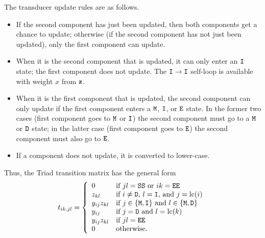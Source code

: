 The transducer update rules are as follows.
\begin{itemize}
\item If the second component has just been updated, then both components
get a chance to update; otherwise (if the second component has not just
been updated), only the first component can update.
\item When it is the second component that is updated, it can only enter an
$\mathtt{I}$ state; the first component does not update.  The $\mathtt{I}\to\mathtt{I}$
self-loop is available with weight $x$ from $\mathbf{z}$.
\item When it is the first component that is updated, the second component
can only update if the first component enters a $\mathtt{M}$, $\mathtt{I}$, or $\mathtt{E}$
state.  In the former two cases (first component goes to $\mathtt{M}$ or $\mathtt{I}$)
the second component must go to a $\mathtt{M}$ or $\mathtt{D}$ state; in the latter
case (first component goes to $\mathtt{E}$) the second component must also go to
$\mathtt{E}$.
\item If a component does not update, it is converted to lower-case.
\end{itemize}

Thus, the Triad transition matrix has the general form
\[
t_{ik,jl} = \left\{ \begin{array}{ll}
0 & \mbox{if $jl=\mathtt{SS}$ or $ik=\mathtt{EE}$} \\
z_{kl} & \mbox{if $i \neq \mathtt{D}$, $l = \mathtt{I}$, and $j=\mathrm{lc}(i)$} \\
y_{ij}z_{kl} & \mbox{if $j \in \{ \mathtt{M},\mathtt{I} \}$ and $l \in \{ \mathtt{M},\mathtt{D} \}$} \\
y_{ij} & \mbox{if $j = \mathtt{D}$ and $l = \mathrm{lc}(k)$} \\
y_{ij}z_{kl} & \mbox{if $jl=\mathtt{EE}$} \\
0 & \mbox{otherwise.}
\end{array} \right.
\]

